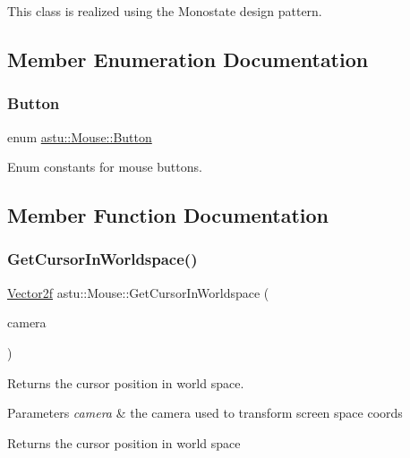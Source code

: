 This class is realized using the Monostate design pattern. 

\subsection{Member Enumeration Documentation}
\mbox{\label{classastu_1_1Mouse_a18205a089111599d94479bfecc5ca7ec}} 
\subsubsection{\texorpdfstring{Button}{Button}}
{\footnotesize\ttfamily enum \hyperlink{classastu_1_1Mouse_a18205a089111599d94479bfecc5ca7ec}{astu\+::\+Mouse\+::\+Button}}

Enum constants for mouse buttons. 

\subsection{Member Function Documentation}
\mbox{\label{classastu_1_1Mouse_a7b27c582a681a9328c9d36367a62183f}} 
\subsubsection{\texorpdfstring{Get\+Cursor\+In\+Worldspace()}{GetCursorInWorldspace()}}
{\footnotesize\ttfamily \hyperlink{classastu_1_1Vector2}{Vector2f} astu\+::\+Mouse\+::\+Get\+Cursor\+In\+Worldspace (\begin{DoxyParamCaption}\item[{const \hyperlink{classastu_1_1suite2d_1_1Camera}{suite2d\+::\+Camera} \&}]{camera }\end{DoxyParamCaption})}

Returns the cursor position in world space.


\begin{DoxyParams}{Parameters}
{\em camera} & the camera used to transform screen space coords \\
\hline
\end{DoxyParams}
\begin{DoxyReturn}{Returns}
the cursor position in world space 
\end{DoxyReturn}
\mbox{\label{classastu_1_1Mouse_a22202c4dec1e13df857a524df45b4fc0}} 
